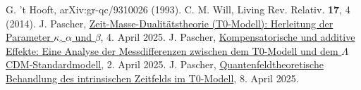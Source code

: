 \documentclass[12pt,a4paper]{article}
\begin{document}
\begin{thebibliography}{99}
		 G. 't Hooft, arXiv:gr-qc/9310026 (1993).
		 C. M. Will, Living Rev. Relativ. \textbf{17}, 4 (2014).
		 J. Pascher, \href{https://github.com/jpascher/T0-Time-Mass-Duality/tree/main/2/pdf/Deutsch/ZeitMasseT0Params.pdf}{Zeit-Masse-Dualitätstheorie (T0-Modell): Herleitung der Parameter \(\kappa\), \(\alpha\) und \(\beta\)}, 4. April 2025.
		 J. Pascher, \href{https://github.com/jpascher/T0-Time-Mass-Duality/tree/main/2/pdf/Deutsch/MessdifferenzenT0Standard.pdf}{Kompensatorische und additive Effekte: Eine Analyse der Messdifferenzen zwischen dem T0-Modell und dem \(\Lambda\)CDM-Standardmodell}, 2. April 2025.
		 J. Pascher, \href{https://github.com/jpascher/T0-Time-Mass-Duality/tree/main/2/pdf/Deutsch/QFTIntrinsischesZeitT0.pdf}{Quantenfeldtheoretische Behandlung des intrinsischen Zeitfelds im T0-Modell}, 8. April 2025.
	\end{thebibliography}
	
\end{document}
